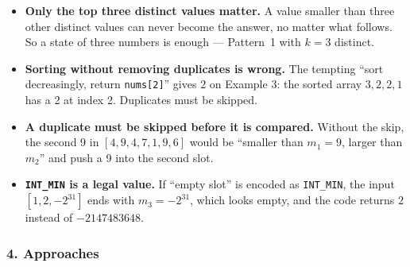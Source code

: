 \begin{itemize}[leftmargin=*]
    \item \textbf{Only the top three distinct values matter.} A value smaller than three other distinct values can never become the answer, no matter what follows. So a state of three numbers is enough --- Pattern~1 with $k = 3$ distinct.
    \item \textbf{Sorting without removing duplicates is wrong.} The tempting ``sort decreasingly, return \texttt{nums[2]}'' gives $2$ on Example 3: the sorted array $3, 2, 2, 1$ has a 2 at index 2. Duplicates must be skipped.
    \item \textbf{A duplicate must be skipped before it is compared.} Without the skip, the second 9 in $[4, 9, 4, 7, 1, 9, 6]$ would be ``smaller than $m_1 = 9$, larger than $m_2$'' and push a 9 into the second slot.
    \item \textbf{\texttt{INT\_MIN} is a legal value.} If ``empty slot'' is encoded as \texttt{INT\_MIN}, the input $[1, 2, -2^{31}]$ ends with $m_3 = -2^{31}$, which looks empty, and the code returns $2$ instead of $-2147483648$.
\end{itemize}

\begin{diagrambox}
\end{diagrambox}

\subsubsection*{4. Approaches}

